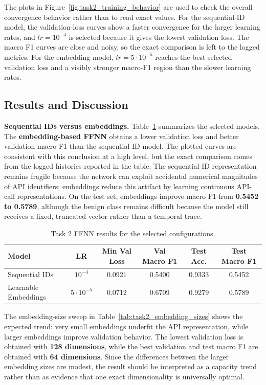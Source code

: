 The plots in Figure~\ref{fig:task2_training_behavior} are used to check the overall convergence behavior rather than to read exact values. For the sequential-ID model, the validation-loss curves show a faster convergence for the larger learning rates, and $lr=10^{-4}$ is selected because it gives the lowest validation loss. The macro F1 curves are close and noisy, so the exact comparison is left to the logged metrics. For the embedding model, $lr=5\cdot10^{-5}$ reaches the best selected validation loss and a visibly stronger macro-F1 region than the slower learning rates.

\subsection{Results and Discussion}

\textbf{Sequential IDs versus embeddings.} Table~\ref{tab:task2_results} summarizes the selected models. The \textbf{embedding-based FFNN} obtains a lower validation loss and better validation macro F1 than the sequential-ID model. The plotted curves are consistent with this conclusion at a high level, but the exact comparison comes from the logged histories reported in the table. The sequential-ID representation remains fragile because the network can exploit accidental numerical magnitudes of API identifiers; embeddings reduce this artifact by learning continuous API-call representations. On the test set, embeddings improve macro F1 from \textbf{0.5452 to 0.5789}, although the benign class remains difficult because the model still receives a fixed, truncated vector rather than a temporal trace.

\begin{table}[H]
\centering
\caption{Task 2 FFNN results for the selected configurations.}
\label{tab:task2_results}
\begin{tabular}{lccccc}
\toprule
\textbf{Model} & \textbf{LR} & \textbf{Min Val Loss} & \textbf{Val Macro F1} & \textbf{Test Acc.} & \textbf{Test Macro F1} \\
\midrule
Sequential IDs & $10^{-4}$ & 0.0921 & 0.5400 & 0.9333 & 0.5452 \\
Learnable Embeddings & $5\cdot10^{-5}$ & 0.0712 & 0.6709 & 0.9279 & 0.5789 \\
\bottomrule
\end{tabular}
\end{table}

The embedding-size sweep in Table~\ref{tab:task2_embedding_sizes} shows the expected trend: very small embeddings underfit the API representation, while larger embeddings improve validation behavior. The lowest validation loss is obtained with \textbf{128 dimensions}, while the best validation and test macro F1 are obtained with \textbf{64 dimensions}. Since the differences between the larger embedding sizes are modest, the result should be interpreted as a capacity trend rather than as evidence that one exact dimensionality is universally optimal.

